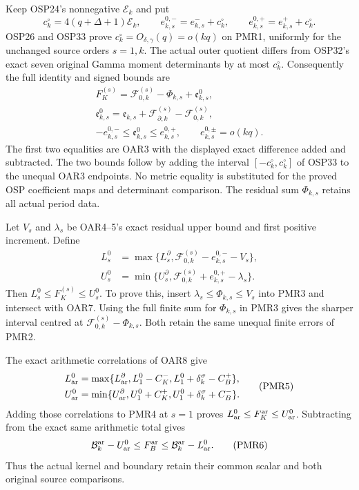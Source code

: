 \documentclass[11pt,a4paper]{article}
\begin{document}
Keep OSP24's nonnegative $\mathcal E_k$ and put
\[
 c_k^\circ=4(q+\Delta+1)\mathcal E_k,
 \qquad e_{k,s}^{0,-}=e_{k,s}^-+c_k^\circ,
 \qquad e_{k,s}^{0,+}=e_{k,s}^++c_k^\circ.
 \tag{PMR2}
\]
OSP26 and OSP33 prove $c_k^\circ=O_{\delta,\gamma}(q)=o(kq)$
on PMR1, uniformly for the unchanged source orders $s=1,k$.
The actual outer quotient differs from OSP32's exact seven
original Gamma moment determinants by at most $c_k^\circ$.
Consequently the full identity and signed bounds are
\[
 \begin{gathered}
 F_K^{(s)}=\mathcal F_{0,k}^{(s)}-\Phi_{k,s}+\mathfrak e^0_{k,s},\\
 \mathfrak e^0_{k,s}=\mathfrak e_{k,s}
       +\mathcal F_{\partial,k}^{(s)}-\mathcal F_{0,k}^{(s)},\\
 -e_{k,s}^{0,-}\le\mathfrak e^0_{k,s}\le e_{k,s}^{0,+},
 \qquad e_{k,s}^{0,\pm}=o(kq).
 \end{gathered}\tag{PMR3}
\]
The first two equalities are OAR3 with the displayed exact
difference added and subtracted. The two bounds follow by adding
the interval $[-c_k^\circ,c_k^\circ]$ of OSP33 to the unequal
OAR3 endpoints. No metric equality is substituted for the
proved OSP coefficient maps and determinant comparison.
The residual sum $\Phi_{k,s}$ retains all actual period data.

Let $V_s$ and $\lambda_s$ be OAR4--5's exact residual upper
bound and first positive increment. Define
\[
 \begin{split}
 L_s^0&=\max\{L_s^\partial,
                \mathcal F_{0,k}^{(s)}-e_{k,s}^{0,-}-V_s\},\\
 U_s^0&=\min\{U_s^\partial,
                \mathcal F_{0,k}^{(s)}+e_{k,s}^{0,+}-\lambda_s\}.
 \end{split}\tag{PMR4}
\]
Then $L_s^0\le F_K^{(s)}\le U_s^0$. To prove this, insert
$\lambda_s\le\Phi_{k,s}\le V_s$ into PMR3 and intersect
with OAR7. Using the full finite sum for $\Phi_{k,s}$ in PMR3
gives the sharper interval centred at
$\mathcal F_{0,k}^{(s)}-\Phi_{k,s}$. Both retain the same
unequal finite errors of PMR2.

The exact arithmetic correlations of OAR8 give
\[
 \begin{split}
 L_{\rm ar}^0&=\max\{L_{\rm ar}^\partial,L_1^0-C_K^-,
                                      L_1^0+\delta_k^\sigma-C_B^+\},\\
 U_{\rm ar}^0&=\min\{U_{\rm ar}^\partial,U_1^0+C_K^+,
                                      U_1^0+\delta_k^\sigma+C_B^-\}.
 \end{split}\tag{PMR5}
\]
Adding those correlations to PMR4 at $s=1$ proves
$L_{\rm ar}^0\le F_K^{\rm ar}\le U_{\rm ar}^0$.
Subtracting from the exact same arithmetic total gives
\[
 \mathcal B_k^{\rm ar}-U_{\rm ar}^0
      \le F_B^{\rm ar}\le\mathcal B_k^{\rm ar}-L_{\rm ar}^0.
 \tag{PMR6}
\]
Thus the actual kernel and boundary retain their common scalar
and both original source comparisons.
\end{document}
